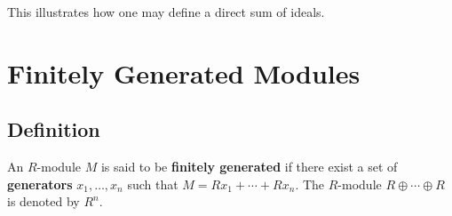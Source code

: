 \documentclass[11pt]{article}
\begin{document}
This illustrates how one may define a direct sum of ideals.


\section{Finitely Generated Modules}


\subsection{Definition}

An $R$-module $M$ is said to be \textbf{finitely generated} if there exist a set of \textbf{generators} $x_{1}, \ldots, x_{n}$ such that $M = Rx_{1} + \cdots + Rx_{n}$. The $R$-module $R \oplus \cdots \oplus R$ is denoted by $R^{n}$.
\end{document}
